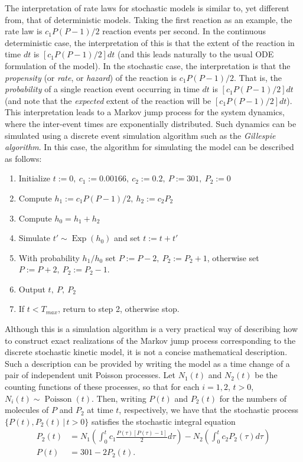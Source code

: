 The interpretation of rate laws for stochastic models is similar
to, yet different from, that of deterministic models. Taking the
first reaction as an example, the rate law is $c_1P(P-1)/2$ reaction
events per second. In the continuous deterministic case, the
interpretation of this is that the extent of the reaction in time
$dt$ is $[c_1P(P-1)/2]dt$ (and this leads naturally to the usual ODE
formulation of the model). In the stochastic case, the
interpretation is that the \emph{propensity} (or \emph{rate}, or
\emph{hazard}) of the reaction is $c_1P(P-1)/2$. That is, the
\emph{probability} of a single reaction event occurring in time
$dt$ is $[c_1P(P-1)/2]dt$ (and note that the \emph{expected} extent of
the reaction will be $[c_1P(P-1)/2]dt$). This interpretation leads to a Markov
jump process for the system dynamics, where the inter-event times
are exponentially distributed. Such dynamics can be simulated
using a discrete event simulation algorithm such as the
\emph{Gillespie algorithm}. In this case, the algorithm for
simulating the model can be described as follows:
\begin{enumerate}
\item Initialize $t:=0,\ c_1:=0.00166,\ c_2:=0.2,\ P:=301,\ P_2:=0$
\item Compute $h_1:=c_1P(P-1)/2,\ h_2:=c_2P_2$
\item Compute $h_0=h_1+h_2$
\item Simulate $t'\sim \operatorname{Exp}(h_0)$ and set $t:=t+t'$
\item With probability $h_1/h_0$ set $P:=P-2,\ P_2:=P_2+1$,
otherwise set $P:=P+2,\ P_2:=P_2-1$.
\item Output $t,\ P,\ P_2$
\item If $t<T_{max}$, return to step 2, otherwise stop.
\end{enumerate}
Although this is a simulation algorithm is a very practical way of
describing how to construct exact realizations of the Markov jump
process corresponding to the discrete stochastic kinetic model, it
is not a concise mathematical description. Such a description can
be provided by writing the model as a time change of a pair of
independent unit Poisson processes. Let $N_1(t)$ and $N_2(t)$ be
the counting functions of these processes, so that for each
$i=1,2$, $t>0$, $N_i(t)\sim \operatorname{Poisson}(t)$. Then,
writing $P(t)$ and $P_2(t)$ for the numbers of molecules of $P$
and $P_2$ at time $t$, respectively, we have that the stochastic process
$\{P(t),P_2(t)\,|\,t>0\}$ satisfies the stochastic integral equation
\begin{align*}
P_2(t) &= N_1\left(\int_0^t
c_1\frac{P(\tau)[P(\tau)-1]}{2}d\tau\right) - N_2\left(\int_0^t
c_2 P_2(\tau)d\tau\right) \\[2pt]
P(t) &= 301 - 2P_2(t).
\end{align*}
